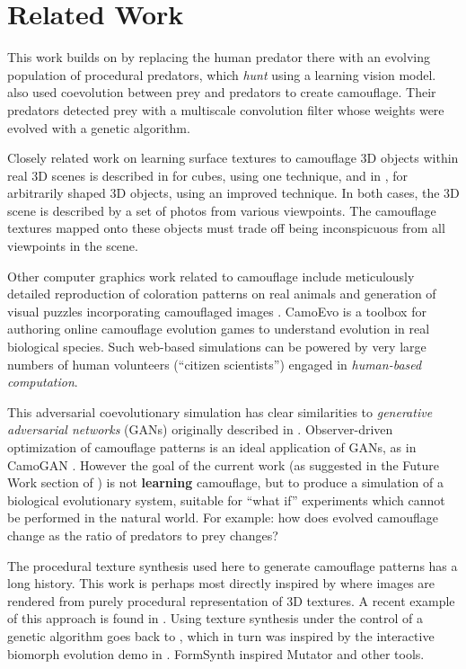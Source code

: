 \documentclass[letterpaper]{article}
\newcommand{\jargon}[1]{\textit{#1}}
\begin{document}
\section{Related Work}
This work builds on \citet{reynolds_iec_2011} by replacing the human predator there with an evolving population of procedural predators, which \jargon{hunt} using a learning vision model. \citet{harrington_coevolution_2014} also used coevolution between prey and predators to create camouflage. Their predators detected prey with a multiscale convolution filter whose weights were evolved with a genetic algorithm.
\par
Closely related work on learning surface textures to camouflage 3D objects within real 3D scenes is described in \citet{owens_camouflaging_2014} for cubes, using one technique, and in \citet{guo_ganmouflage_2022}, for arbitrarily shaped 3D objects, using an improved technique. In both cases, the 3D scene is described by a set of photos from various viewpoints. The camouflage textures mapped onto these objects must trade off being inconspicuous from all viewpoints in the scene.
\par
Other computer graphics work related to camouflage include meticulously detailed reproduction of coloration patterns on real animals \cite{de_gomensoro_malheiros_leopard_2020} and generation of visual puzzles incorporating camouflaged images \cite{chu_camo_image_2010} \cite{Zhang_Yin_Nie_Zheng_2020}. CamoEvo \cite{hancock_camoevo_2022} is a toolbox for authoring online camouflage evolution games to understand evolution in real biological species. Such web-based simulations can be powered by very large numbers of human volunteers (“citizen scientists”) engaged in \jargon{human-based computation}.
\par
This adversarial coevolutionary simulation has clear similarities to \jargon{generative adversarial networks} (GANs) originally described in \citet{goodfellow_gan_2014}. Observer-driven optimization of camouflage patterns is an ideal application of GANs, as in CamoGAN \cite{talas_camogan_2020}. However the goal of the current work (as suggested in the Future Work section of \citet{reynolds_iec_2011}) is not \textbf{learning} camouflage, but to produce a simulation of a biological evolutionary system, suitable for “what if” experiments which cannot be performed in the natural world. For example: how does evolved camouflage change as the ratio of predators to prey changes?
\par
The procedural texture synthesis used here to generate camouflage patterns has a long history. This work is perhaps most directly inspired by \citet{perlin_image_1985} where images are rendered from purely procedural representation of 3D textures. A recent example of this approach is found in \citet{Guerrero_MatFormer_2022}. Using texture synthesis under the control of a genetic algorithm goes back to \citet{sims_artificial_1991}, which in turn was inspired by the interactive biomorph evolution demo in \citet{dawkins_blind_1986}. FormSynth \cite{latham_form_1989} inspired Mutator \cite{todd_evolutionary_1994} and other tools.
\end{document}

